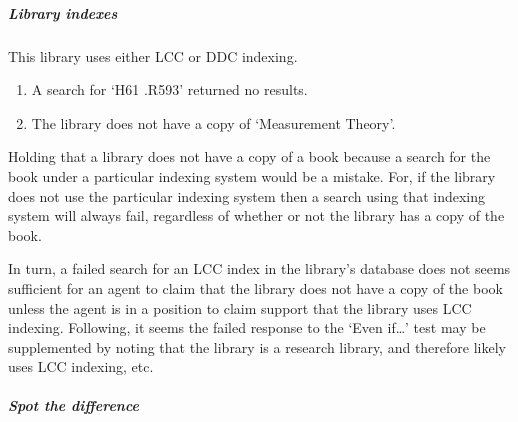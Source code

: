 \paragraph{}

\subparagraph{Library indexes}

\begin{note}
  This library uses either LCC or DDC indexing.
  \begin{enumerate}
  \item A search for `H61 .R593' returned no results.
  \item The library does not have a copy of `Measurement Theory'.
  \end{enumerate}

  Holding that a library does not have a copy of a book because a search for the book under a particular indexing system would be a mistake.
  For, if the library does not use the particular indexing system then a search using that indexing system will always fail, regardless of whether or not the library has a copy of the book.

  In turn, a failed search for an LCC index in the library's database does not seems sufficient for an agent to claim that the library does not have a copy of the book unless the agent is in a position to claim support that the library uses LCC indexing.
  Following, it seems the failed response to the `Even if\dots' test may be supplemented by noting that the library is a research library, and therefore likely uses LCC indexing, etc.\
\end{note}

\paragraph{}

\subparagraph{Spot the difference}

